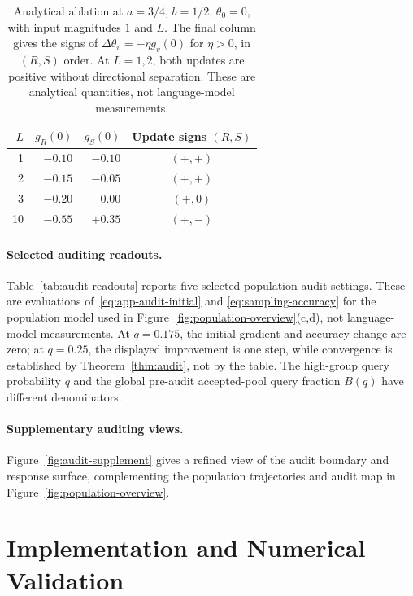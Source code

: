 \begin{table}[H]
\caption{Analytical ablation at $a=3/4$, $b=1/2$, $\theta_0=0$, with input
magnitudes $1$ and $L$. The final
column gives the signs of $\Delta\theta_v=-\eta g_v(0)$ for $\eta>0$, in
$(R,S)$ order. At $L=1,2$, both updates are positive without directional
separation. These are analytical quantities, not language-model measurements.}
\label{tab:analytic}
\centering\small
\begin{tabular}{@{}rrrc@{}}
\toprule
$L$ & $g_R(0)$ & $g_S(0)$ & Update signs $(R,S)$\\
\midrule
1 & $-0.10$ & $-0.10$ & $(+,+)$\\
2 & $-0.15$ & $-0.05$ & $(+,+)$\\
3 & $-0.20$ & $0.00$ & $(+,0)$\\
10 & $-0.55$ & $+0.35$ & $(+,-)$\\
\bottomrule
\end{tabular}

\end{table}

\paragraph{Selected auditing readouts.}
Table~\ref{tab:audit-readouts} reports five selected population-audit settings.
These are evaluations of~\eqref{eq:app-audit-initial} and
\eqref{eq:sampling-accuracy} for the population model used in
Figure~\ref{fig:population-overview}(c,d), not language-model measurements.
At $q=0.175$, the initial gradient and accuracy change are zero; at
$q=0.25$, the displayed improvement is one step, while convergence is
established by Theorem~\ref{thm:audit}, not by the table.
The high-group query probability $q$ and the global pre-audit accepted-pool
query fraction $B(q)$ have different denominators.


\paragraph{Supplementary auditing views.}
Figure~\ref{fig:audit-supplement} gives a refined view of the audit
boundary and response surface, complementing the population trajectories
and audit map in Figure~\ref{fig:population-overview}.


\section{Implementation and Numerical Validation}
\label{app:code}

